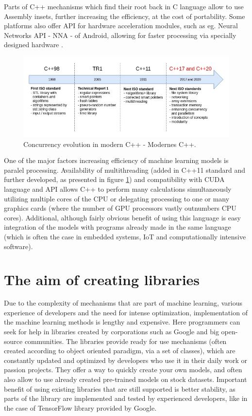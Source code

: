 Parts of C++ mechanisms which find their root back in C language allow to use Assembly insets, further increasing the efficiency, at the cost of portability. Some platforms also offer API for hardware acceleration modules, such as eg. Neural Networks API - NNA - of Android, allowing for faster processing via specially designed hardware \cite{android_nna}.

\begin{figure}[!ht]
    \centering
    \includegraphics[width=150mm]{Rysunki/Rozdzial2/multithreading.jpg}
    \caption{Concurrency evolution in modern C++ - Modernes C++.}
    \label{fig:cpp_history}
\end{figure}

One of the major factors increasing efficiency of machine learning models is paralel processing. Availability of multithreading (added in C++11 standard and further developed, as presented in figure \ref{fig:cpp_history}) and compatibility with CUDA language and API \cite{cpp_cuda} allows C++ to perform many calculations simultaneously utilizing multiple cores of the CPU or delegating processing to one or many graphics cards (where the number of GPU processors vastly outnumbers CPU cores). Additional, although fairly obvious benefit of using this language is easy integration of the models with programs already made in the same language (which is often the case in embedded systems, IoT and computationally intensive software).

\section{The aim of creating libraries}

Due to the complexity of mechanisms that are part of machine learning, various experience of developers and the need for intense optimization, implementation of the machine learning methods is lengthy and expensive. Here programmers can seek for help in libraries created by corporations such as Google and big open-source communities. The libraries provide ready for use mechanisms (often created according to object oriented paradigm, via a set of classes), which are constantly updated and optimized by developers who use it in their daily work or passion projects. They offer a way to quickly create your own models, and often also allow to use already created pre-trained models on stock datasets. Important benefit of using existing libraries that are still supported is better stability, as parts of the library are implemented and tested by experienced developers, like in the case of TensorFlow library provided by Google.


